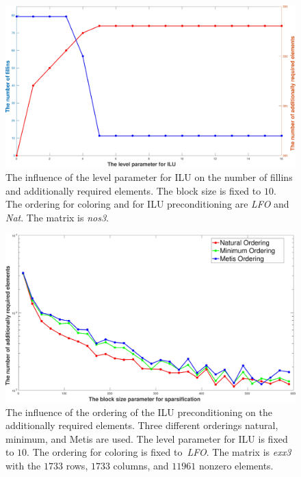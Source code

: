 \documentclass[12pt, oneside]{book}
\begin{document}
\begin{figure}
\centering
\includegraphics[width=0.9\linewidth]{el_fillins.jpg}
\caption{The influence of the level parameter for ILU on the number of fillins and
additionally required elements. The block size is fixed to $10$. The ordering for coloring
and for ILU preconditioning are \textit{LFO} and \textit{Nat}. The matrix is \textit{nos3}.}
\label{el_fillins}
\end{figure}

\begin{figure}
\centering
\includegraphics[width=0.9\linewidth]{add_blocksize.jpg}
\caption{The influence of the ordering of the ILU preconditioning 
on the additionally required elements. 
Three different orderings natural, minimum, and Metis are used.
The level parameter for ILU is fixed to $10$. 
The ordering for coloring is fixed to~\textit{LFO}.
The matrix is \textit{exx3} with the $1733$ rows,
$1733$ columns, and $11961$ nonzero elements.}
\label{add_blocksize}
\end{figure}
\end{document}
